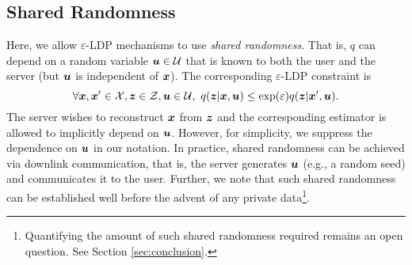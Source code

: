 \subsection{Shared Randomness}
\label{subsec:shared_randomness}
Here, we allow $\varepsilon$-LDP mechanisms to use \emph{shared randomness}. That is, $q$ can depend on a random variable ${\boldsymbol{u}} \in \mathcal{U}$ that is known to both the user and the server (but ${\boldsymbol{u}}$ is independent of ${\boldsymbol{x}}$). The corresponding $\varepsilon$-LDP constraint is
$$\forall {\boldsymbol{x}}, {\boldsymbol{x}}' \in \mathcal{X}, {\boldsymbol{z}} \in \mathcal{Z}, {\boldsymbol{u}} \in \mathcal{U}, ~ q({\boldsymbol{z}}|{\boldsymbol{x}}, {\boldsymbol{u}}) \leq \exp(\varepsilon)q({\boldsymbol{z}}|{\boldsymbol{x}}', {\boldsymbol{u}}). $$
The server wishes to reconstruct ${\boldsymbol{x}}$ from ${\boldsymbol{z}}$ and the corresponding estimator is allowed to implicitly depend on ${\boldsymbol{u}}$.
However, for simplicity, we suppress the dependence on ${\boldsymbol{u}}$ in our notation. In practice, shared randomness can be achieved via downlink communication, that is, the server generates ${\boldsymbol{u}}$ (e.g., a random seed) and communicates it to the user. Further, we note that such shared randomness can be established well before the advent of any private data\footnote{Quantifying the amount of such shared randomness required remains an open question. See Section \ref{sec:conclusion}.}.

